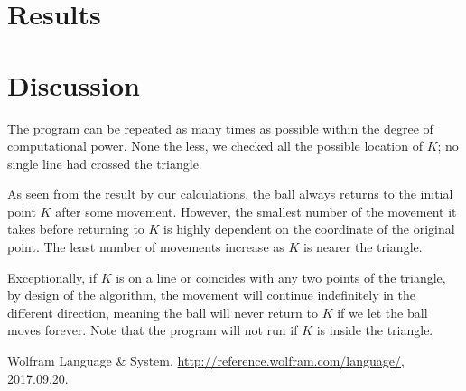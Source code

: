 \documentclass[11pt,a4paper]{article}
\begin{document}
\section{Results}


\section{Discussion}
The program can be repeated as many times as possible within the degree of computational power. None the less, we checked all the possible location of \(K\); no single line had crossed the triangle.

As seen from the result by our calculations, the ball always returns to the initial point \(K\) after some movement. However, the smallest number of the movement it takes before returning to \(K\) is highly dependent on the coordinate of the original point. The least number of movements increase as \(K\) is nearer the triangle. 

Exceptionally, if \(K\) is on a line or coincides with any two points of the triangle, by design of the algorithm, the movement will continue indefinitely in the different direction, meaning the ball will never return to \(K\) if we let the ball moves forever. Note that the program will not run if \(K\) is inside the triangle. 

\begin{thebibliography}{99}

 Wolfram Language \& System, \url{http://reference.wolfram.com/language/}, 2017.09.20.


\end{thebibliography}
\end{document}

